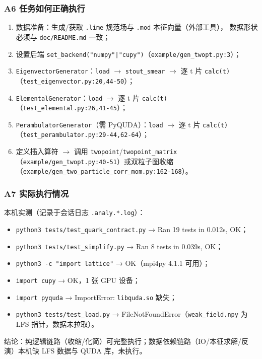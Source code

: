 \documentclass[UTF8]{ctexart}
\begin{document}
\subsubsection{A6 任务如何正确执行}
\begin{enumerate}
\item 数据准备：生成/获取 \texttt{.lime} 规范场与 \texttt{.mod} 本征向量（外部工具），
数据形状必须与 \texttt{doc/README.md} 一致；
\item 设置后端 \texttt{set\_backend("numpy"|"cupy")}（\texttt{example/gen\_twopt.py:3}）；
\item \texttt{EigenvectorGenerator}：\texttt{load} $\to$ \texttt{stout\_smear} $\to$ 逐 t 片
\texttt{calc(t)}（\texttt{\nolinkurl{test_eigenvector.py:20,44-50}}）；
\item \texttt{ElementalGenerator}：\texttt{load} $\to$ 逐 t 片 \texttt{calc(t)}
（\texttt{\nolinkurl{test_elemental.py:26,41-45}}）；
\item \texttt{PerambulatorGenerator}（需 PyQUDA）：\texttt{load} $\to$ 逐 t 片 \texttt{calc(t)}
（\texttt{\nolinkurl{test_perambulator.py:29-44,62-64}}）；
\item 定义插入算符 $\to$ 调用 \texttt{twopoint}/\texttt{twopoint\_matrix}
（\texttt{\nolinkurl{example/gen_twopt.py:40-51}}）或双粒子图收缩
（\texttt{\nolinkurl{example/gen_two_particle_corr_mom.py:162-168}}）。
\end{enumerate}

\subsubsection{A7 实际执行情况}
本机实测（记录于会话日志 \texttt{.analy.*.log}）：
\begin{itemize}
\item \texttt{python3 tests/test\_quark\_contract.py} → Ran 19 tests in 0.012s, OK；
\item \texttt{python3 tests/test\_simplify.py} → Ran 8 tests in 0.039s, OK；
\item \texttt{python3 -c "import lattice"} → OK（mpi4py 4.1.1 可用）；
\item \texttt{import cupy} → OK，1 张 GPU 设备；
\item \texttt{import pyquda} → ImportError: \texttt{libquda.so} 缺失；
\item \texttt{python3 tests/test\_load.py} → FileNotFoundError（\texttt{weak\_field.npy}
为 LFS 指针，数据未拉取）。
\end{itemize}
结论：纯逻辑链路（收缩/化简）可完整执行；数据依赖链路（IO/本征求解/反演）本机缺
LFS 数据与 QUDA 库，未执行。
\end{document}
